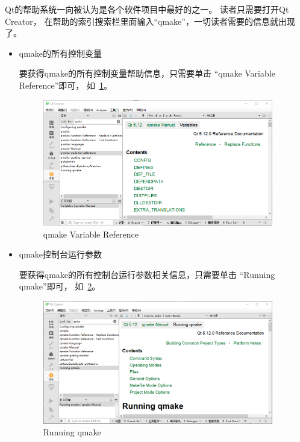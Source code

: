 Qt的帮助系统一向被认为是各个软件项目中最好的之一。
读者只需要打开Qt Creator，
在帮助的索引搜索栏里面输入“qmake”，一切读者需要的信息就出现了。

\begin{itemize}

\item qmake的所有控制变量

要获得qmake的所有控制变量帮助信息，只需要单击
“qmake Variable Reference”即可，
如\figurename\ \ref{p000003}。


\begin{figure}[ht] %
\centering %
\includegraphics[width=0.95\textwidth]{chapter01/images/qmake_help_1.png} %
\caption{qmake Variable Reference} %
\label{p000003} %
\end{figure}


\item qmake控制台运行参数

要获得qmake的所有控制台运行参数相关信息，只需要单击
“Running qmake”即可，
如\figurename\ \ref{p000004}。

\begin{figure}[ht] %
\centering %
\includegraphics[width=0.95\textwidth]{chapter01/images/qmake_help_2.png} %
\caption{Running qmake} %
\label{p000004} %
\end{figure}



\end{itemize}
